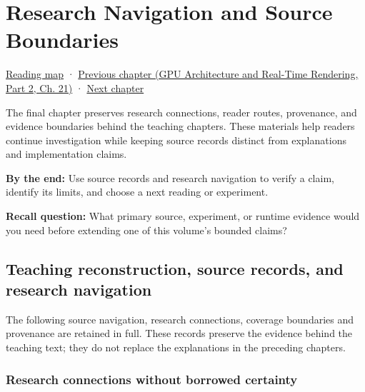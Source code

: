 \chapter{Research Navigation and Source Boundaries}\label{02-foundations-ii-ch039-research-navigation-and-source-boundaries}\hypertarget{02-foundations-ii-ch039}{}\label{stagechapter:02-foundations-ii-ch039}

\hypertarget{02-foundations-ii-ch039-research-navigation-and-source-boundaries}{}

\hyperref[volume-reading-map]{Reading map} · \href{../06-GPU-Architecture-and-Real-Time-Rendering-P02/main.pdf\#nameddest=06-engine-ii-ch045}{Previous chapter (GPU Architecture and Real-Time Rendering, Part 2, Ch. 21)} · \hyperref[04-visual-computing-ii-ch031]{Next chapter}

The final chapter preserves research connections, reader routes, provenance, and evidence boundaries behind the teaching chapters. These materials help readers continue investigation while keeping source records distinct from explanations and implementation claims.

\textbf{By the end:} Use source records and research navigation to verify a claim, identify its limits, and choose a next reading or experiment.

\textbf{Recall question:} What primary source, experiment, or runtime evidence would you need before extending one of this volume's bounded claims?

\section{Teaching reconstruction, source records, and research navigation}\label{02-foundations-ii-ch039-teaching-reconstruction-source-records-and-research-navigation}

\hypertarget{02-foundations-ii-ch039-teaching-reconstruction-source-records-and-research-navigation}{}

The following source navigation, research connections, coverage boundaries and provenance are retained in full. These records preserve the evidence behind the teaching text; they do not replace the explanations in the preceding chapters.

\subsection{Research connections without borrowed certainty}\label{02-foundations-ii-ch039-research-connections-without-borrowed-certainty}

